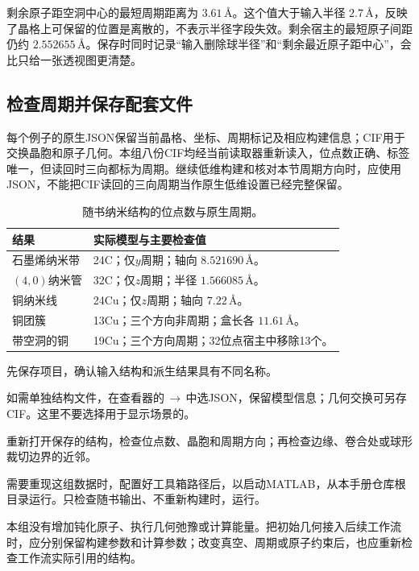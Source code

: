 剩余原子距空洞中心的最短周期距离为 $3.61\,\text{\AA}$。这个值大于输入半径 $2.7\,\text{\AA}$，反映了晶格上可保留的位置是离散的，不表示半径字段失效。剩余宿主的最短原子间距仍约 $2.552655\,\text{\AA}$。保存时同时记录“输入删除球半径”和“剩余最近原子距中心”，会比只给一张透视图更清楚。

\subsection{检查周期并保存配套文件}

每个例子的原生JSON保留当前晶格、坐标、周期标记及相应构建信息；CIF用于交换晶胞和原子几何。本组八份CIF均经当前读取器重新读入，位点数正确、标签唯一，但读回时三向都标为周期。继续低维构建和核对本节周期方向时，应使用JSON，不能把CIF读回的三向周期当作原生低维设置已经完整保留。

\begin{table}[htbp]
\centering\small
\caption{随书纳米结构的位点数与原生周期。}
\begin{tabularx}{\linewidth}{lX}
\toprule
结果 & 实际模型与主要检查值\\
\midrule
石墨烯纳米带 & 24C；仅$y$周期；轴向 $8.521690\,\text{\AA}$。\\
$(4,0)$纳米管 & 32C；仅$z$周期；半径 $1.566085\,\text{\AA}$。\\
铜纳米线 & 24Cu；仅$z$周期；轴向 $7.22\,\text{\AA}$。\\
铜团簇 & 13Cu；三个方向非周期；盒长各 $11.61\,\text{\AA}$。\\
带空洞的铜 & 19Cu；三个方向周期；32位点宿主中移除13个。\\
\bottomrule
\end{tabularx}
\end{table}

\begin{steps}
  \item 先保存项目，确认输入结构和派生结果具有不同名称。
  \item 如需单独结构文件，在查看器的\,$\rightarrow$\,中选JSON，保留模型信息；几何交换可另存CIF。这里不要选择用于显示场景的。
  \item 重新打开保存的结构，检查位点数、晶胞和周期方向；再检查边缘、卷合处或球形裁切边界的近邻。
  \item 需要重现这组数据时，配置好工具箱路径后，以启动MATLAB\regmark{}，从本手册仓库根目录运行。只检查随书输出、不重新构建时，运行。
\end{steps}

本组没有增加钝化原子、执行几何弛豫或计算能量。把初始几何接入后续工作流时，应分别保留构建参数和计算参数；改变真空、周期或原子约束后，也应重新检查工作流实际引用的结构。
